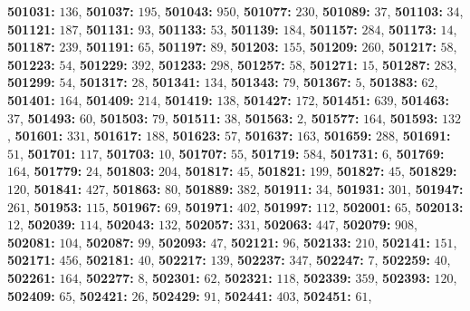 \textsf{\bfseries 501031:} $136$, \textsf{\bfseries 501037:} $195$, \textsf{\bfseries 501043:} $950$, \textsf{\bfseries 501077:} $230$, \textsf{\bfseries 501089:} $37$, \textsf{\bfseries 501103:} $34$, \textsf{\bfseries 501121:} $187$, \textsf{\bfseries 501131:} $93$, \textsf{\bfseries 501133:} $53$, \textsf{\bfseries 501139:} $184$, \textsf{\bfseries 501157:} $284$, \textsf{\bfseries 501173:} $14$, \textsf{\bfseries 501187:} $239$, \textsf{\bfseries 501191:} $65$, \textsf{\bfseries 501197:} $89$, \textsf{\bfseries 501203:} $155$, \textsf{\bfseries 501209:} $260$, \textsf{\bfseries 501217:} $58$, \textsf{\bfseries 501223:} $54$, \textsf{\bfseries 501229:} $392$, \textsf{\bfseries 501233:} $298$, \textsf{\bfseries 501257:} $58$, \textsf{\bfseries 501271:} $15$, \textsf{\bfseries 501287:} $283$, \textsf{\bfseries 501299:} $54$, \textsf{\bfseries 501317:} $28$, \textsf{\bfseries 501341:} $134$, \textsf{\bfseries 501343:} $79$, \textsf{\bfseries 501367:} $5$, \textsf{\bfseries 501383:} $62$, \textsf{\bfseries 501401:} $164$, \textsf{\bfseries 501409:} $214$, \textsf{\bfseries 501419:} $138$, \textsf{\bfseries 501427:} $172$, \textsf{\bfseries 501451:} $639$, \textsf{\bfseries 501463:} $37$, \textsf{\bfseries 501493:} $60$, \textsf{\bfseries 501503:} $79$, \textsf{\bfseries 501511:} $38$, \textsf{\bfseries 501563:} $2$, \textsf{\bfseries 501577:} $164$, \textsf{\bfseries 501593:} $132$, \textsf{\bfseries 501601:} $331$, \textsf{\bfseries 501617:} $188$, \textsf{\bfseries 501623:} $57$, \textsf{\bfseries 501637:} $163$, \textsf{\bfseries 501659:} $288$, \textsf{\bfseries 501691:} $51$, \textsf{\bfseries 501701:} $117$, \textsf{\bfseries 501703:} $10$, \textsf{\bfseries 501707:} $55$, \textsf{\bfseries 501719:} $584$, \textsf{\bfseries 501731:} $6$, \textsf{\bfseries 501769:} $164$, \textsf{\bfseries 501779:} $24$, \textsf{\bfseries 501803:} $204$, \textsf{\bfseries 501817:} $45$, \textsf{\bfseries 501821:} $199$, \textsf{\bfseries 501827:} $45$, \textsf{\bfseries 501829:} $120$, \textsf{\bfseries 501841:} $427$, \textsf{\bfseries 501863:} $80$, \textsf{\bfseries 501889:} $382$, \textsf{\bfseries 501911:} $34$, \textsf{\bfseries 501931:} $301$, \textsf{\bfseries 501947:} $261$, \textsf{\bfseries 501953:} $115$, \textsf{\bfseries 501967:} $69$, \textsf{\bfseries 501971:} $402$, \textsf{\bfseries 501997:} $112$, \textsf{\bfseries 502001:} $65$, \textsf{\bfseries 502013:} $12$, \textsf{\bfseries 502039:} $114$, \textsf{\bfseries 502043:} $132$, \textsf{\bfseries 502057:} $331$, \textsf{\bfseries 502063:} $447$, \textsf{\bfseries 502079:} $908$, \textsf{\bfseries 502081:} $104$, \textsf{\bfseries 502087:} $99$, \textsf{\bfseries 502093:} $47$, \textsf{\bfseries 502121:} $96$, \textsf{\bfseries 502133:} $210$, \textsf{\bfseries 502141:} $151$, \textsf{\bfseries 502171:} $456$, \textsf{\bfseries 502181:} $40$, \textsf{\bfseries 502217:} $139$, \textsf{\bfseries 502237:} $347$, \textsf{\bfseries 502247:} $7$, \textsf{\bfseries 502259:} $40$, \textsf{\bfseries 502261:} $164$, \textsf{\bfseries 502277:} $8$, \textsf{\bfseries 502301:} $62$, \textsf{\bfseries 502321:} $118$, \textsf{\bfseries 502339:} $359$, \textsf{\bfseries 502393:} $120$, \textsf{\bfseries 502409:} $65$, \textsf{\bfseries 502421:} $26$, \textsf{\bfseries 502429:} $91$, \textsf{\bfseries 502441:} $403$, \textsf{\bfseries 502451:} $61$, 
